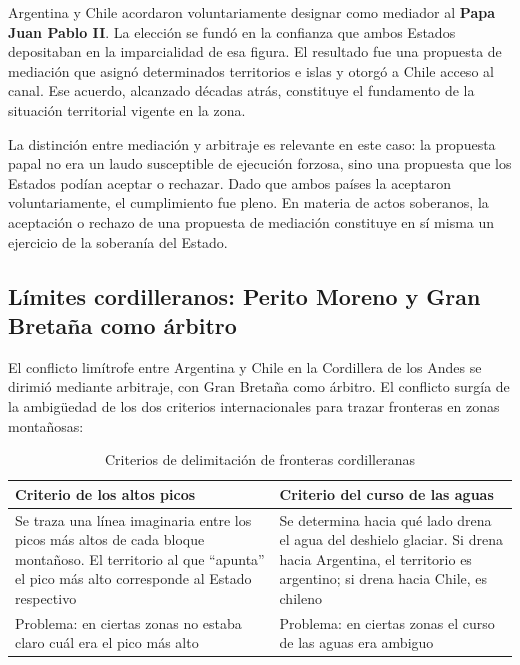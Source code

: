 \documentclass[12pt,oneside]{book}
\begin{document}
Argentina y Chile acordaron voluntariamente designar como mediador al \textbf{Papa Juan Pablo II}. La elección se fundó en la confianza que ambos Estados depositaban en la imparcialidad de esa figura. El resultado fue una propuesta de mediación que asignó determinados territorios e islas y otorgó a Chile acceso al canal. Ese acuerdo, alcanzado décadas atrás, constituye el fundamento de la situación territorial vigente en la zona.

\begin{note}
La distinción entre mediación y arbitraje es relevante en este caso: la propuesta papal no era un laudo susceptible de ejecución forzosa, sino una propuesta que los Estados podían aceptar o rechazar. Dado que ambos países la aceptaron voluntariamente, el cumplimiento fue pleno. En materia de actos soberanos, la aceptación o rechazo de una propuesta de mediación constituye en sí misma un ejercicio de la soberanía del Estado.
\end{note}

\subsection{Límites cordilleranos: Perito Moreno y Gran Bretaña como árbitro}

El conflicto limítrofe entre Argentina y Chile en la Cordillera de los Andes se dirimió mediante arbitraje, con Gran Bretaña como árbitro. El conflicto surgía de la ambigüedad de los dos criterios internacionales para trazar fronteras en zonas montañosas:

\begin{table}[H]
\centering
\caption{Criterios de delimitación de fronteras cordilleranas}
\begin{tabularx}{\textwidth}{
    >{\raggedright\arraybackslash}X
    >{\raggedright\arraybackslash}X
}
\toprule
\textbf{Criterio de los altos picos} & \textbf{Criterio del curso de las aguas} \\
\midrule
Se traza una línea imaginaria entre los picos más altos de cada bloque montañoso. El territorio al que ``apunta'' el pico más alto corresponde al Estado respectivo & Se determina hacia qué lado drena el agua del deshielo glaciar. Si drena hacia Argentina, el territorio es argentino; si drena hacia Chile, es chileno \\
\addlinespace
Problema: en ciertas zonas no estaba claro cuál era el pico más alto & Problema: en ciertas zonas el curso de las aguas era ambiguo \\
\bottomrule
\end{tabularx}
\end{table}
\end{document}
